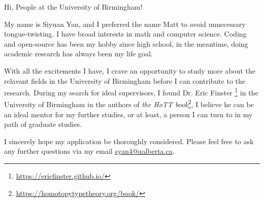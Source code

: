 \documentclass[11pt]{article}
\begin{document}
    Hi, People at the University of Birmingham!

    My name is Siyuan Yan,
    and I preferred the name Matt to avoid unnecessary tongue-twisting.
    I have broad interests in math and computer science.
    Coding and open-source has been my hobby since high school,
    in the meantime, doing academic research has always been my life goal.

    

    

    With all the excitements I have,
    I crave an opportunity to study more about the relavant fields
    in the University of Birmingham before I can contribute to the research.
    During my search for ideal supervisors,
    I found Dr. Eric Finster \footnote{\url{https://ericfinster.github.io/}} in the University of Birmingham in the
    authors of \textit{the HoTT book}\footnote{\url{https://homotopytypetheory.org/book/}},
    I believe he can be an ideal mentor for my further studies,
    or at least, a person I can turn to in my path of graduate studies.

    I sincerely hope my application be thoroughly considered.
    Please feel free to ask any further questions via my email \href{mailto:syan4@ualberta.ca}{syan4@ualberta.ca}.
\end{document}
